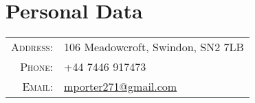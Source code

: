 \section{Personal Data}

\begin{tabular}{rl}
    \textsc{Address:}   & 106 Meadowcroft, Swindon, SN2 7LB \\
    \textsc{Phone:}     & +44 7446 917473 \\
    \textsc{Email:}     & \href{mailto:mporter271@gmail.com}{mporter271@gmail.com}
\end{tabular}